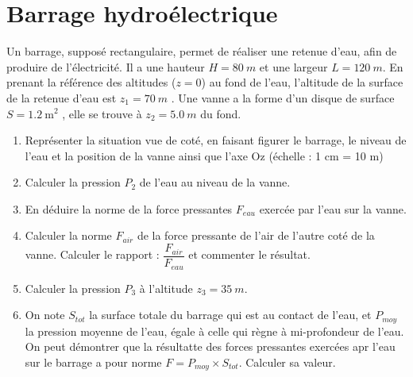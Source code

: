 \documentclass[a4paper,12pt,fleqn]{article}%
\begin{document}
\section{Barrage hydroélectrique}
Un barrage, supposé rectangulaire, permet de réaliser une retenue d’eau, afin de produire de l’électricité. Il a une hauteur $H =\SI{80}{m}$ et une largeur $L=\SI{120}{m}$. En prenant la référence des altitudes ($z=0$) au fond de l’eau, l’altitude de la surface de la retenue d’eau est $z_1=\SI{70}{m}$ . Une vanne a la forme d’un disque de surface $S =\SI{1,2}{\meter\squared}$ , elle se trouve à $z_2=\SI{5,0}{m}$ du fond.
\begin{enumerate}
    \item Représenter la situation vue de coté, en faisant figurer le barrage, le niveau de l'eau et la position de la vanne ainsi que l'axe Oz (échelle : 1 cm = 10 m)
    \item Calculer la pression $P_2$ de l'eau au niveau de la vanne.
    \item En déduire la norme de la force pressantes $F_{eau}$ exercée par l'eau sur la vanne.
    \item Calculer la norme $F_{air}$ de la force pressante de l'air de l'autre coté de la vanne. Calculer le rapport : $\dfrac{F_{air}}{F_{eau}}$ et commenter le résultat.
    \item Calculer la pression $P_3$ à l'altitude $z_3 = \SI{35}{m}$.
    \item On note $S_{tot}$ la surface totale du barrage qui est au contact de l'eau, et $P_{moy}$ la pression moyenne de l'eau, égale à celle qui règne à mi-profondeur de l'eau. On peut démontrer que la résultatte des forces pressantes exercées apr l'eau sur le barrage a pour norme $F=P_{moy}\times S_{tot}$. Calculer sa valeur.
\end{enumerate}
\end{document}
